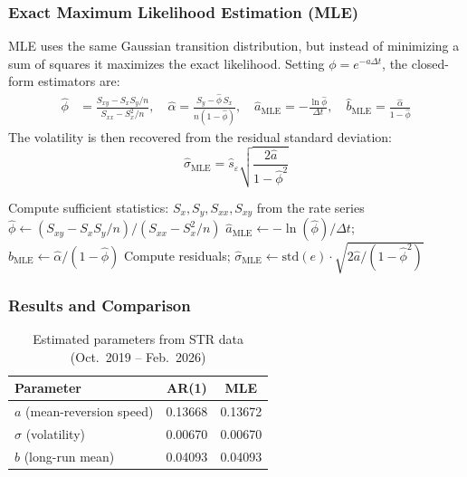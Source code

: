 \documentclass[12pt, a4paper]{article}
\begin{document}
\subsubsection{Exact Maximum Likelihood Estimation (MLE)}

MLE uses the same Gaussian transition distribution, but instead of minimizing a sum of squares it maximizes the exact likelihood. Setting $\phi = e^{-a\Delta t}$, the closed-form estimators are:
\begin{align}
\hat{\phi} &= \frac{S_{xy} - S_x S_y / n}{S_{xx} - S_x^2 / n}, \quad
\hat{\alpha} = \frac{S_y - \hat{\phi}\, S_x}{n(1-\hat{\phi})}, \quad
\hat{a}_{\text{MLE}} = -\frac{\ln\hat{\phi}}{\Delta t}, \quad
\hat{b}_{\text{MLE}} = \frac{\hat{\alpha}}{1-\hat{\phi}}
\end{align}
The volatility is then recovered from the residual standard deviation:
\begin{equation}
\hat{\sigma}_{\text{MLE}} = \hat{s}_\varepsilon \sqrt{\frac{2\hat{a}}{1 - \hat{\phi}^2}}
\end{equation}

\begin{algorithm}[H]
\caption{Exact MLE for the OU Process}
\begin{algorithmic}[1]
\State Compute sufficient statistics: $S_x, S_y, S_{xx}, S_{xy}$ from the rate series
\State $\hat{\phi} \leftarrow (S_{xy} - S_x S_y/n) / (S_{xx} - S_x^2/n)$
\State $\hat{a}_{\text{MLE}} \leftarrow -\ln(\hat{\phi}) / \Delta t$; \quad $\hat{b}_{\text{MLE}} \leftarrow \hat{\alpha} / (1 - \hat{\phi})$
\State Compute residuals; $\hat{\sigma}_{\text{MLE}} \leftarrow \mathrm{std}(e)\cdot\sqrt{2\hat{a}/(1-\hat{\phi}^2)}$
\end{algorithmic}
\end{algorithm}

\subsubsection{Results and Comparison}

\begin{table}[H]
\centering
\begin{tabular}{lcc}
\toprule
\textbf{Parameter} & \textbf{AR(1)} & \textbf{MLE} \\
\midrule
$a$ (mean-reversion speed) & 0.13668 & 0.13672 \\
$\sigma$ (volatility)       & 0.00670 & 0.00670 \\
$b$ (long-run mean)         & 0.04093 & 0.04093 \\
\bottomrule
\end{tabular}
\caption{Estimated parameters from \texteuro STR data (Oct.\ 2019 -- Feb.\ 2026)}
\end{table}
\end{document}
